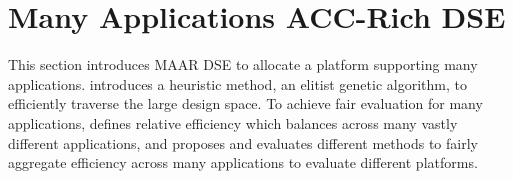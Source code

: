 \vspace{-2pt}
\section{Many Applications ACC-Rich DSE}
\label{sec:eval}

This section introduces MAAR DSE to allocate a platform supporting many applications.  introduces a heuristic method, an elitist genetic algorithm, to efficiently traverse the large design space. To achieve fair evaluation for many applications,  defines relative efficiency which balances across many vastly different applications, and  proposes and evaluates different methods to fairly aggregate efficiency across many applications to evaluate different platforms.



















